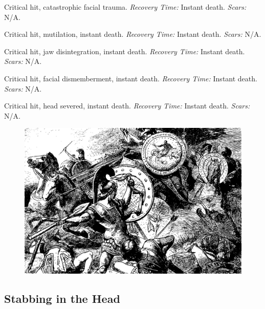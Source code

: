 \documentclass[12pt]{book}
\begin{document}
\begin{description}[labelwidth=1.5em, leftmargin=*, itemsep=0.4em]
    \item[16 -] Critical hit, catastrophic facial trauma. \textit{Recovery Time:} Instant death. \textit{Scars:} N/A.
    \item[17 -] Critical hit, mutilation, instant death. \textit{Recovery Time:} Instant death. \textit{Scars:} N/A.
    \item[18 -] Critical hit, jaw disintegration, instant death. \textit{Recovery Time:} Instant death. \textit{Scars:} N/A.
    \item[19 -] Critical hit, facial dismemberment, instant death. \textit{Recovery Time:} Instant death. \textit{Scars:} N/A.
    \item[20 -] Critical hit, head severed, instant death. \textit{Recovery Time:} Instant death. \textit{Scars:} N/A.
\end{description}

\begin{figure}[h]
    \centering
    \includegraphics[width=\textwidth]{./images/combat09.pdf}
\end{figure}

\subsection{Stabbing in the Head}
\end{document}
